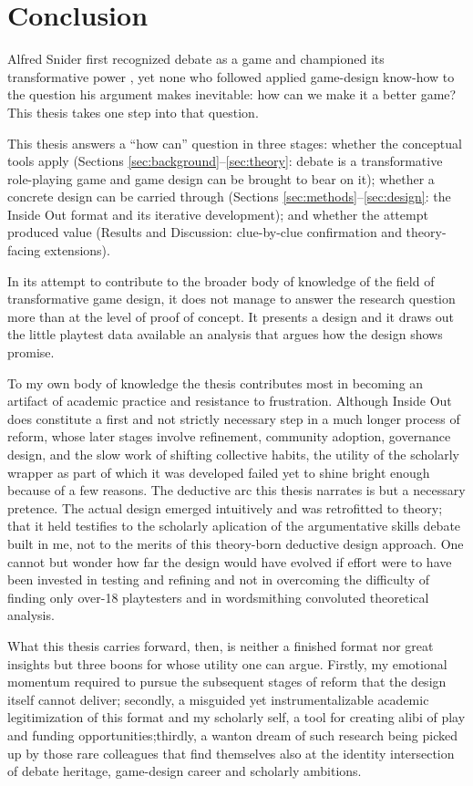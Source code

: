\section{Conclusion}

Alfred Snider first recognized debate as a game and championed its transformative power \parencite{snider1982gaming,snider1984gaming}, yet none who followed applied game-design know-how to the question his argument makes inevitable: how can we make it a better game? This thesis takes one step into that question.

This thesis answers a ``how can'' question in three stages: whether the conceptual tools apply (Sections \ref{sec:background}--\ref{sec:theory}: debate is a transformative role-playing game and game design can be brought to bear on it); whether a concrete design can be carried through (Sections \ref{sec:methods}--\ref{sec:design}: the Inside Out format and its iterative development); and whether the attempt produced value (Results and Discussion: clue-by-clue confirmation and theory-facing extensions).

In its attempt to contribute to the broader body of knowledge of the field of transformative game design, it does not manage to answer the research question more than at the level of proof of concept. It presents a design and it draws out the little playtest data available an analysis that argues how the design shows promise. 

To my own body of knowledge the thesis contributes most in becoming an artifact of academic practice and resistance to frustration. Although Inside Out does constitute a first and not strictly necessary step in a much longer process of reform, whose later stages involve refinement, community adoption, governance design, and the slow work of shifting collective habits, the utility of the scholarly wrapper as part of which it was developed failed yet to shine bright enough because of a few reasons. The deductive arc this thesis narrates is but a necessary pretence. The actual design emerged intuitively and was retrofitted to theory; that it held testifies to the scholarly aplication of the argumentative skills debate built in me, not to the merits of this theory-born deductive design approach. One cannot but wonder how far the design would have evolved if effort were to have been invested in testing and refining and not in overcoming the difficulty of finding only over-18 playtesters and in wordsmithing convoluted theoretical analysis.

What this thesis carries forward, then, is neither a finished format nor great insights but three boons for whose utility one can argue. Firstly, my emotional momentum required to pursue the subsequent stages of reform that the design itself cannot deliver; secondly, a misguided yet instrumentalizable academic legitimization of this format and my scholarly self, a tool for creating alibi of play and funding opportunities;thirdly, a wanton dream of such research being picked up by those rare colleagues that find themselves also at the identity intersection of debate heritage, game-design career and scholarly ambitions. 

